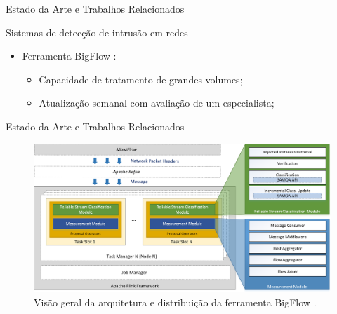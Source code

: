 \documentclass[aspectratio=43,10pt]{beamer}
\newcommand{\nota}[1]{\hspace*{-0.5cm}\textit{{\color[rgb]{1,0,0}Nota: #1}}}
\begin{document}
\begin{frame}[fragile]{Estado da Arte e Trabalhos Relacionados}
\begin{alertblock}{Sistemas de detecção de intrusão em redes}
  \begin{itemize}
    \item Ferramenta BigFlow \cite{Viegas2019}:
    \begin{itemize}
      \item Capacidade de tratamento de grandes volumes;
      \item Atualização semanal com avaliação de um especialista;
    \end{itemize}
  \end{itemize}
\end{alertblock}
\end{frame}

\begin{frame}[fragile]{Estado da Arte e Trabalhos Relacionados}
\begin{figure}[ht]
  \centering
  \includegraphics[width=\textwidth]{figuras/bigflow-fig5-bigflow_arch.png}
  \caption{Visão geral da arquitetura e distribuição da ferramenta BigFlow \cite{Viegas2019}.}
  \label{fig:bigflow-arch}
\end{figure}
\end{frame}

\end{document}
